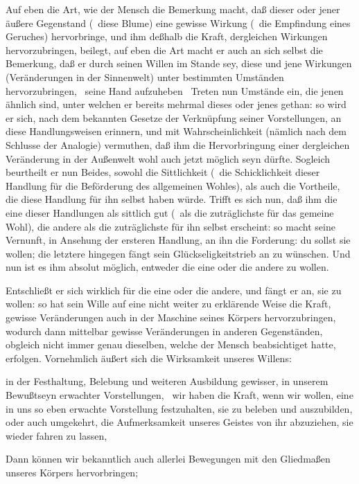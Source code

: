 \begin{aufza}
\begin{aufzb}
\item Auf eben die Art, wie der Mensch die Bemerkung macht, daß dieser oder jener äußere Gegenstand (\zB\  diese Blume) eine gewisse Wirkung (\zB\  die Empfindung eines Geruches) hervorbringe, und ihm deßhalb die Kraft, dergleichen Wirkungen hervorzubringen, beilegt, auf eben die Art macht er auch an sich selbst die Bemerkung, daß er durch seinen Willen im Stande sey, diese und jene Wirkungen (Veränderungen in der Sinnenwelt) unter bestimmten Umständen hervorzubringen, \zB\  seine Hand aufzuheben \udgl\  Treten nun Umstände ein, die jenen ähnlich sind, unter welchen er bereits mehrmal dieses oder jenes gethan: so wird er sich, nach dem bekannten Gesetze der Verknüpfung seiner Vorstellungen, an diese Handlungsweisen erinnern, und mit Wahrscheinlichkeit (nämlich nach dem Schlusse der Analogie) vermuthen, daß ihm die Hervorbringung einer dergleichen Veränderung in der Außenwelt wohl auch jetzt möglich seyn dürfte. Sogleich beurtheilt er nun Beides, sowohl die Sittlichkeit (\dh\  die Schicklichkeit dieser Handlung für die Beförderung des allgemeinen Wohles), als auch die Vortheile, die diese Handlung für ihn selbst haben würde. Trifft es sich nun, daß ihm die eine dieser Handlungen als sittlich gut (\dh\  als die zuträglichste für das gemeine Wohl), die andere als die zuträglichste für ihn selbst erscheint: so macht seine Vernunft, in Ansehung der ersteren Handlung, an ihn die Forderung: du sollst sie wollen; die letztere hingegen fängt sein Glückseligkeitstrieb an zu wünschen. Und nun ist es ihm absolut möglich, entweder die eine oder die andere zu wollen.
\item Entschließt er sich wirklich für die eine oder die andere, und fängt er an, sie zu wollen: so hat sein Wille auf eine nicht weiter zu erklärende Weise die Kraft, gewisse Veränderungen auch in der Maschine seines Körpers hervorzubringen, wodurch dann mittelbar gewisse Veränderungen in anderen Gegenständen, obgleich nicht immer genau dieselben, welche der Mensch beabsichtiget hatte, erfolgen. Vornehmlich äußert sich die Wirksamkeit unseres Willens:
\begin{aufzc}
\item in der Festhaltung, Belebung und weiteren Ausbildung gewisser, in unserem Bewußtseyn erwachter Vorstellungen, \dh\  wir haben die Kraft, wenn wir wollen, eine in uns so eben erwachte Vorstellung festzuhalten, sie zu beleben und auszubilden, oder auch umgekehrt, die Aufmerksamkeit unseres Geistes von ihr abzuziehen, sie wieder fahren zu lassen, \udgl\ 
\item Dann können wir bekanntlich auch allerlei Bewegungen mit den Gliedmaßen unseres Körpers hervorbringen;

\end{aufzc}
\end{aufzb}
\end{aufza}

